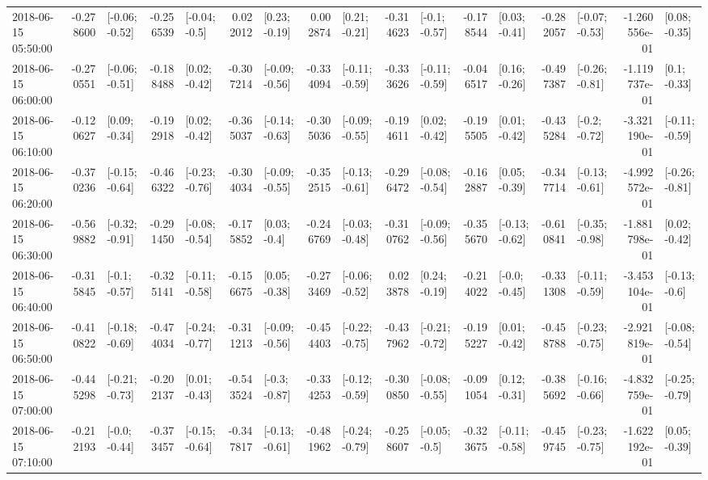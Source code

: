 \begin{tabular}{lrlrlrlrlrlrlrlrl}
2018-06-15 05:50:00 & -0.278600 &  [-0.06; -0.52] & -0.256539 &   [-0.04; -0.5] &  0.022012 &   [0.23; -0.19] &  0.002874 &   [0.21; -0.21] & -0.314623 &   [-0.1; -0.57] & -0.178544 &   [0.03; -0.41] & -0.282057 &  [-0.07; -0.53] & -1.260556e-01 &   [0.08; -0.35] \\
2018-06-15 06:00:00 & -0.270551 &  [-0.06; -0.51] & -0.188488 &   [0.02; -0.42] & -0.307214 &  [-0.09; -0.56] & -0.334094 &  [-0.11; -0.59] & -0.333626 &  [-0.11; -0.59] & -0.046517 &   [0.16; -0.26] & -0.497387 &  [-0.26; -0.81] & -1.119737e-01 &    [0.1; -0.33] \\
2018-06-15 06:10:00 & -0.120627 &   [0.09; -0.34] & -0.192918 &   [0.02; -0.42] & -0.365037 &  [-0.14; -0.63] & -0.305036 &  [-0.09; -0.55] & -0.194611 &   [0.02; -0.42] & -0.195505 &   [0.01; -0.42] & -0.435284 &   [-0.2; -0.72] & -3.321190e-01 &  [-0.11; -0.59] \\
2018-06-15 06:20:00 & -0.370236 &  [-0.15; -0.64] & -0.466322 &  [-0.23; -0.76] & -0.304034 &  [-0.09; -0.55] & -0.352515 &  [-0.13; -0.61] & -0.296472 &  [-0.08; -0.54] & -0.162887 &   [0.05; -0.39] & -0.347714 &  [-0.13; -0.61] & -4.992572e-01 &  [-0.26; -0.81] \\
2018-06-15 06:30:00 & -0.569882 &  [-0.32; -0.91] & -0.291450 &  [-0.08; -0.54] & -0.175852 &    [0.03; -0.4] & -0.246769 &  [-0.03; -0.48] & -0.310762 &  [-0.09; -0.56] & -0.355670 &  [-0.13; -0.62] & -0.610841 &  [-0.35; -0.98] & -1.881798e-01 &   [0.02; -0.42] \\
2018-06-15 06:40:00 & -0.315845 &   [-0.1; -0.57] & -0.325141 &  [-0.11; -0.58] & -0.156675 &   [0.05; -0.38] & -0.273469 &  [-0.06; -0.52] &  0.023878 &   [0.24; -0.19] & -0.214022 &   [-0.0; -0.45] & -0.331308 &  [-0.11; -0.59] & -3.453104e-01 &   [-0.13; -0.6] \\
2018-06-15 06:50:00 & -0.410822 &  [-0.18; -0.69] & -0.474034 &  [-0.24; -0.77] & -0.311213 &  [-0.09; -0.56] & -0.454403 &  [-0.22; -0.75] & -0.437962 &  [-0.21; -0.72] & -0.195227 &   [0.01; -0.42] & -0.458788 &  [-0.23; -0.75] & -2.921819e-01 &  [-0.08; -0.54] \\
2018-06-15 07:00:00 & -0.445298 &  [-0.21; -0.73] & -0.202137 &   [0.01; -0.43] & -0.543524 &   [-0.3; -0.87] & -0.334253 &  [-0.12; -0.59] & -0.300850 &  [-0.08; -0.55] & -0.091054 &   [0.12; -0.31] & -0.385692 &  [-0.16; -0.66] & -4.832759e-01 &  [-0.25; -0.79] \\
2018-06-15 07:10:00 & -0.212193 &   [-0.0; -0.44] & -0.373457 &  [-0.15; -0.64] & -0.347817 &  [-0.13; -0.61] & -0.481962 &  [-0.24; -0.79] & -0.258607 &   [-0.05; -0.5] & -0.323675 &  [-0.11; -0.58] & -0.459745 &  [-0.23; -0.75] & -1.622192e-01 &   [0.05; -0.39] \\

\end{tabular}
